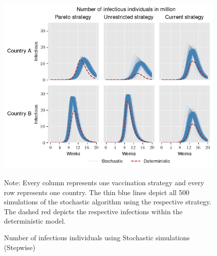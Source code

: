 \begin{figure}[h!]
\centering
\includegraphics[scale=0.85]{images/piecewise_stochastic_infectious.png}\\
\begin{flushleft}
\scriptsize{Note:} Every column represents one vaccination strategy and every row represents one country. The thin blue lines depict all 500 simulations of the stochastic algorithm using the respective strategy. The dashed red depicts the respective infections within the deterministic model. 
\end{flushleft}
\caption{Number of infectious individuals using Stochastic simulations (Stepwise)}
\label{fig:results_piecewise_infectious_dead_stochastic}
\end{figure}

